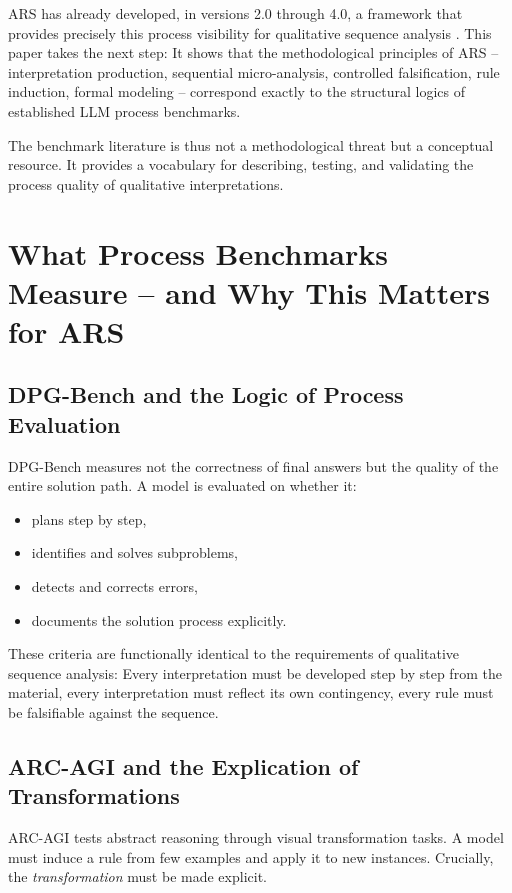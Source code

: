 \documentclass[12pt,a4paper]{article}
\begin{document}
ARS has already developed, in versions 2.0 through 4.0, a framework that provides precisely this process visibility for qualitative sequence analysis \cite{koop2024ars}. This paper takes the next step: It shows that the methodological principles of ARS – interpretation production, sequential micro-analysis, controlled falsification, rule induction, formal modeling – correspond exactly to the structural logics of established LLM process benchmarks.

The benchmark literature is thus not a methodological threat but a conceptual resource. It provides a vocabulary for describing, testing, and validating the process quality of qualitative interpretations.

\section{What Process Benchmarks Measure – and Why This Matters for ARS}

\subsection{DPG-Bench and the Logic of Process Evaluation}

DPG-Bench \cite{zhong2024dpg} measures not the correctness of final answers but the quality of the entire solution path. A model is evaluated on whether it:

\begin{itemize}
    \item plans step by step,
    \item identifies and solves subproblems,
    \item detects and corrects errors,
    \item documents the solution process explicitly.
\end{itemize}

These criteria are functionally identical to the requirements of qualitative sequence analysis: Every interpretation must be developed step by step from the material, every interpretation must reflect its own contingency, every rule must be falsifiable against the sequence.

\subsection{ARC-AGI and the Explication of Transformations}

ARC-AGI \cite{chollet2019measure} tests abstract reasoning through visual transformation tasks. A model must induce a rule from few examples and apply it to new instances. Crucially, the \textit{transformation} must be made explicit.
\end{document}
